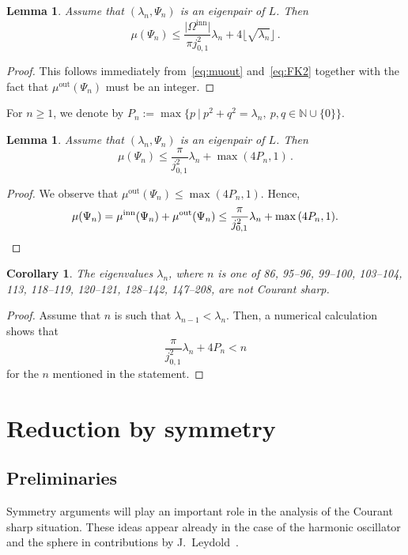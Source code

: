 \documentclass[a4paper,reqno,11pt]{amsart}
\newtheorem{lemma}[thm]{Lemma}
\newtheorem{cor}[thm]{Corollary}
\theoremstyle{remark}
\theoremstyle{definition}
\numberwithin{equation}{section}
\begin{document}
\begin{lemma}
\label{lemma2.2}
Assume that $(\lambda_n,\Psi_n)$ is an eigenpair of $L$. Then
\begin{equation}
\mu(\Psi_n)\leq  \frac{\bigl|\Omega^{\text{inn}}\bigr|}{\pi j_{0,1}^2}\lambda_n + 4\lfloor\sqrt{\lambda_n}\rfloor \,.
\end{equation}
\end{lemma}

\begin{proof}
This follows immediately from~\eqref{eq:muout} and~\eqref{eq:FK2} together with
the fact that $\mu^{\text{out}}(\Psi_n)$ must be an integer.
\end{proof}

For $n\geq 1$, we denote by $P_n:=\max\{p~|~p^2+q^2=\lambda_n,\ p,q\in\mathbb{N}\cup\{0\}\}$. 

\begin{lemma}
\label{lemma2.3}
Assume that $(\lambda_n,\Psi_n)$ is an eigenpair of $L$. Then
\[
\mu(\Psi_n)\leq \frac{\pi}{j_{0,1}^2}\lambda_n+ \max{(4 P_n, 1)}\,.
\]
\end{lemma}

\begin{proof}
We observe that  $\mu^{\text{out}}(\Psi_n)\leq \max{(4 P_n, 1)}$.
Hence,
\[
\mu(\Psi_n)=\mu^{\text{inn}}(\Psi_n)+\mu^{\text{out}}(\Psi_n)\leq 
\frac{\pi}{j_{0,1}^2}\lambda_n+\max{(4 P_n, 1)}.\qedhere
\]
\end{proof}

\begin{cor}
\label{cor2.3}
The eigenvalues $\lambda_n$, where $n$ is one of 86, 95--96, 99--100, 103--104, 
113, 118--119, 120--121, 128--142, 147--208,
are not Courant sharp.
\end{cor}

\begin{proof}
Assume that $n$ is such that $\lambda_{n-1}<\lambda_n$. Then, a numerical
calculation shows that
\[
\frac{\pi}{j_{0,1}^2}\lambda_n+  4P_n <n
\]
for the $n$ mentioned in the statement.
\end{proof}

\section{Reduction by symmetry}
\label{Section3}

\subsection{Preliminaries}
Symmetry arguments will play an important role in the analysis of the Courant 
sharp situation. These ideas appear already in the case of the harmonic 
oscillator and the sphere in contributions by J.~Leydold~\cite{Ley0,Ley}.
\end{document}
